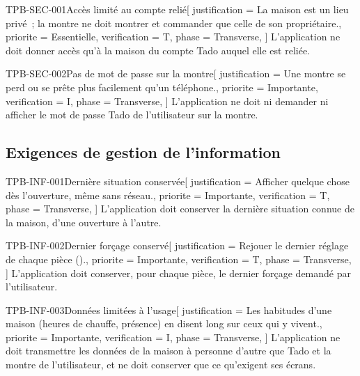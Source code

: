 \begin{exigence}{TPB-SEC-001}{Accès limité au compte relié}[
    justification = {La maison est un lieu privé~; la montre ne doit montrer et commander
                     que celle de son propriétaire.},
    priorite      = {Essentielle},
    verification  = {T},
    phase         = {Transverse},
  ]
  L'application ne doit donner accès qu'à la maison du compte Tado auquel elle est reliée.
\end{exigence}

\begin{exigence}{TPB-SEC-002}{Pas de mot de passe sur la montre}[
    justification = {Une montre se perd ou se prête plus facilement qu'un téléphone.},
    priorite      = {Importante},
    verification  = {I},
    phase         = {Transverse},
  ]
  L'application ne doit ni demander ni afficher le mot de passe Tado de l'utilisateur sur la
  montre.
\end{exigence}

\subsection{Exigences de gestion de l'information}

\begin{exigence}{TPB-INF-001}{Dernière situation conservée}[
    justification = {Afficher quelque chose dès l'ouverture, même sans réseau.},
    priorite      = {Importante},
    verification  = {T},
    phase         = {Transverse},
  ]
  L'application doit conserver la dernière situation connue de la maison, d'une ouverture
  à l'autre.
\end{exigence}

\begin{exigence}{TPB-INF-002}{Dernier forçage conservé}[
    justification = {Rejouer le dernier réglage de chaque pièce ().},
    priorite      = {Importante},
    verification  = {T},
    phase         = {Transverse},
  ]
  L'application doit conserver, pour chaque pièce, le dernier forçage demandé par
  l'utilisateur.
\end{exigence}

\begin{exigence}{TPB-INF-003}{Données limitées à l'usage}[
    justification = {Les habitudes d'une maison (heures de chauffe, présence) en disent long
                     sur ceux qui y vivent.},
    priorite      = {Importante},
    verification  = {I},
    phase         = {Transverse},
  ]
  L'application ne doit transmettre les données de la maison à personne d'autre que Tado
  et la montre de l'utilisateur, et ne doit conserver que ce qu'exigent ses écrans.
\end{exigence}
